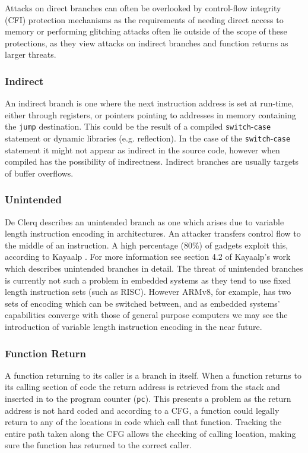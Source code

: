 Attacks on direct branches can often be overlooked by control-flow integrity (CFI) protection mechanisms as the requirements of needing direct access to memory or performing glitching attacks often lie outside of the scope of these protections, as they view attacks on indirect branches and function returns as larger threats.

\subsubsection*{Indirect}
An indirect branch is one where the next instruction address is set at run-time, either through registers, or pointers pointing to addresses in memory containing the \verb|jump| destination. This could be the result of a compiled \verb|switch|-\verb|case| statement or dynamic libraries (e.g. reflection). In the case of the \verb|switch|-\verb|case| statement it might not appear as indirect in the source code, however when compiled has the possibility of indirectness. Indirect branches are usually targets of buffer overflows.

\subsubsection*{Unintended}
De Clerq \cite{DeClercq2017} describes an unintended branch as one which arises due to variable length instruction encoding in architectures. An attacker transfers control flow to the middle of an instruction. A high percentage (80\%) of gadgets exploit this, according to Kayaalp \cite{Kayaalp2014}. For more information see section 4.2 of Kayaalp's work \cite{Kayaalp2014} which describes unintended branches in detail. The threat of unintended branches is currently not such a problem in embedded systems as they tend to use fixed length instruction sets (such as RISC). However ARMv8, for example, has two sets of encoding which can be switched between, and as embedded systems' capabilities converge with those of general purpose computers we may see the introduction of variable length instruction encoding in the near future.

\subsubsection*{Function Return}
A function returning to its caller is a branch in itself. When a function returns to its calling section of code the return address is retrieved from the stack and inserted in to the program counter (\verb|pc|). This presents a problem as the return address is not hard coded and according to a CFG, a function could legally return to any of the locations in code which call that function. Tracking the entire path taken along the CFG allows the checking of calling location, making sure the function has returned to the correct caller.

